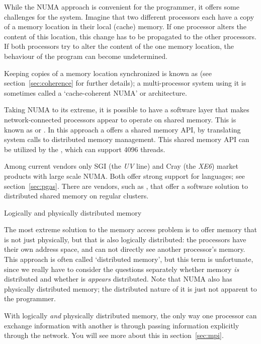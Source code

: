 While the \ac{NUMA} approach is convenient for the programmer, it offers some
challenges for the system. Imagine that two different processors each
have a copy of a memory location in their local (cache) memory. If one
processor alters the content of this location, this change has to be
propagated to the other processors. If both processors try to alter
the content of the one memory location, the behaviour of the program
can become undetermined.

Keeping copies of a memory location synchronized is known as
 (see section~\ref{sec:coherence} for further details);
a multi-processor system using it is sometimes called a
`cache-coherent NUMA' or  architecture.

Taking NUMA to its extreme, it is possible to have a software layer
that makes network-connected processors appear to operate on shared memory.
This is known as  
or . In this approach
a  offers a shared memory API, by translating
system calls to distributed memory management. This shared memory 
API can be utilized by the , which
can support 4096 threads.

Among current vendors only SGI (the \emph{UV} line) and
Cray (the \emph{XE6}) market products with large scale
NUMA. Both offer strong support for  languages; see
section~\ref{sec:pgas}. There are vendors, such as ,
that offer a software solution to distributed shared memory on regular clusters.

 {Logically and physically distributed memory}

The most extreme solution to the memory access problem is to offer
memory that is not just physically, but that is also logically
distributed: the processors have their own address space, and can not
directly see another processor's memory. This approach is often called
`distributed memory', but this term is unfortunate, since we really
have to consider the questions separately whether memory \emph{is}
distributed and whether is \emph{appears} distributed.
Note that NUMA also has physically
distributed memory; the distributed nature of it is just not apparent
to the programmer.

With logically \emph{and} physically distributed memory, the only way
one processor can exchange information with another is through passing
information explicitly through the network. You will see more about
this in section~\ref{sec:mpi}.

